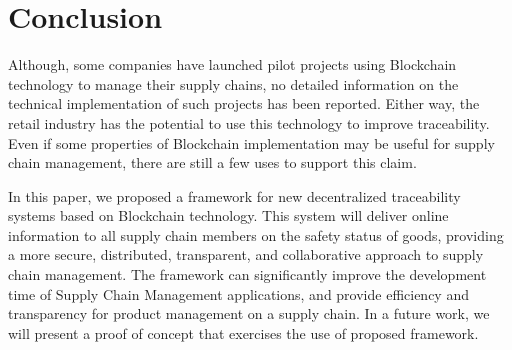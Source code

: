 \section{Conclusion} \label{sec:Conclusion}

Although, some companies have launched pilot projects using Blockchain technology to manage their supply chains, no detailed information on the technical implementation of such projects has been reported. Either way, the retail industry has the potential to use this technology to improve traceability.  Even if some properties of Blockchain implementation may be useful for supply chain management, there are still a few uses to support this claim. 

In this paper, we proposed a framework for new decentralized traceability systems based on Blockchain technology. This system will deliver online information to all supply chain members on the safety status of goods, providing a more secure, distributed, transparent, and collaborative approach to supply chain management. The framework can significantly improve the development time of Supply Chain Management applications, and provide efficiency and transparency for product management on a supply chain. In a future work, we will present a proof of concept that exercises the use of proposed framework.
